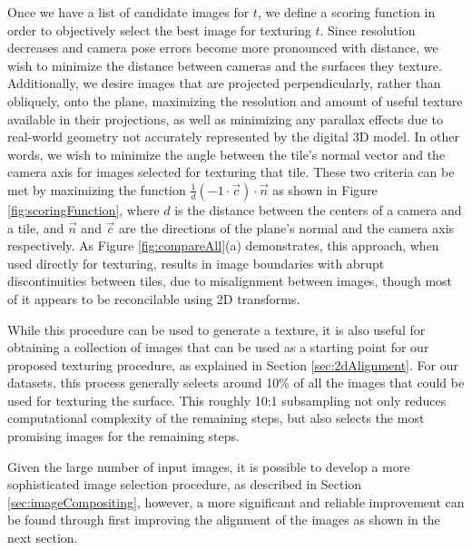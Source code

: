 \documentclass[]{spie}  %
\begin{document}
Once we have a list of candidate images for $t$, we define a scoring
function in order to objectively select the best image for texturing
$t$. Since resolution decreases and camera pose errors become more
pronounced with distance, we wish to minimize the distance between
cameras and the surfaces they texture. Additionally, we desire images
that are projected perpendicularly, rather than obliquely, onto the
plane, maximizing the resolution and amount of useful texture
available in their projections, as well as minimizing any parallax
effects due to real-world geometry not accurately represented by the
digital 3D model. In other words, we wish to minimize the angle
between the tile's normal vector and the camera axis for images
selected for texturing that tile. These two criteria can be met by
maximizing the function $\frac{1}{d} (-1 \cdot \vec{c}) \cdot \vec{n}$
as shown in Figure \ref{fig:scoringFunction}, where $d$ is the
distance between the centers of a camera and a tile, and $\vec{n}$ and
$\vec{c}$ are the directions of the plane's normal and the camera axis
respectively. As Figure \ref{fig:compareAll}(a) demonstrates, this
approach, when used directly for texturing, results in image
boundaries with abrupt discontinuities between tiles, due to
misalignment between images, though most of it appears to be
reconcilable using 2D transforms.

While this procedure can be used to generate a texture, it is also
useful for obtaining a collection of images that can be used as a
starting point for our proposed texturing procedure, as explained in
Section \ref{sec:2dAlignment}. For our datasets, this process
generally selects around 10\% of all the images that could be used for
texturing the surface. This roughly 10:1 subsampling not only reduces
computational complexity of the remaining steps, but also selects the
most promising images for the remaining steps.

Given the large number of input images, it is possible to develop a
more sophisticated image selection procedure, as described in Section
\ref{sec:imageCompositing}, however, a more significant and reliable
improvement can be found through first improving the alignment of the
images as shown in the next section.
\end{document}

